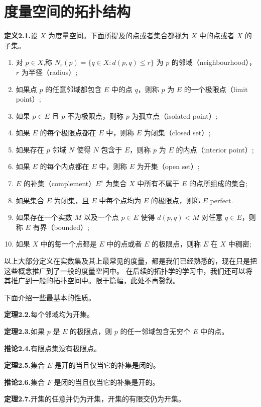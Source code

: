 \documentclass{article}
\begin{document}
\section{度量空间的拓扑结构}
\textbf{定义2.1.}设 $X$ 为度量空间。下面所提及的点或者集合都视为 $X$ 中的点或者 $X$ 的子集。
\begin{enumerate}[label={\textbullet}]
    \item 对 $p\in X$,称 $N_r(p) = \{q\in X: d(p,q)\leq r\}$ 为 $p$ 的邻域（neighbourhood），$r$ 为半径（radius）;
    \item 如果点 $p$ 的任意邻域都包含 $E$ 中的点 $q$，则称 $p$ 为 $E$ 的一个极限点（limit point）;
    \item 如果 $p\in E$ 且 $p$ 不为极限点，则称 $p$ 为孤立点（isolated point）;
    \item 如果 $E$ 的每个极限点都在 $E$ 中，则称 $E$ 为闭集（closed set）;
    \item 如果存在 $p$ 邻域 $N$ 使得 $N$ 包含于 $E$，则称 $p$ 为 $E$ 的内点（interior point）;
    \item 如果 $E$ 的每个内点都在 $E$ 中，则称 $E$ 为开集（open set）;
    \item $E$ 的补集（complement）$E^c$ 为集合 $X$ 中所有不属于 $E$ 的点所组成的集合;
    \item 如果集合 $E$ 为闭集，且 $E$ 中每个点均为 $E$ 的极限点，则称 $E$ perfect.
    \item 如果存在一个实数 $M$ 以及一个点 $p\in E$ 使得 $d(p,q)<M$ 对任意 $q\in E$，则称 $E$ 有界（bounded）;
    \item 如果 $X$ 中的每一个点都是 $E$ 中的点或者 $E$ 的极限点，则称 $E$ 在 $X$ 中稠密;
\end{enumerate}

以上大部分定义在实数集及其上最常见的度量，都是我们已经熟悉的，现在只是把这些概念推广到了一般的度量空间中。
在后续的拓扑学的学习中，我们还可以将其推广到一般的拓扑空间中。限于篇幅，此处不再赘叙。

下面介绍一些最基本的性质。

\textbf{定理2.2.}每个邻域均为开集。

\textbf{定理2.3.}如果 $p$ 是 $E$ 的极限点，则 $p$ 的任一邻域包含无穷个 $E$ 中的点。

\textbf{推论2.4.}有限点集没有极限点。

\textbf{定理2.5.}集合 $E$ 是开的当且仅当它的补集是闭的。

\textbf{推论2.6.}集合 $F$ 是闭的当且仅当它的补集是开的。

\textbf{定理2.7.}开集的任意并仍为开集，开集的有限交仍为开集。
\end{document}
